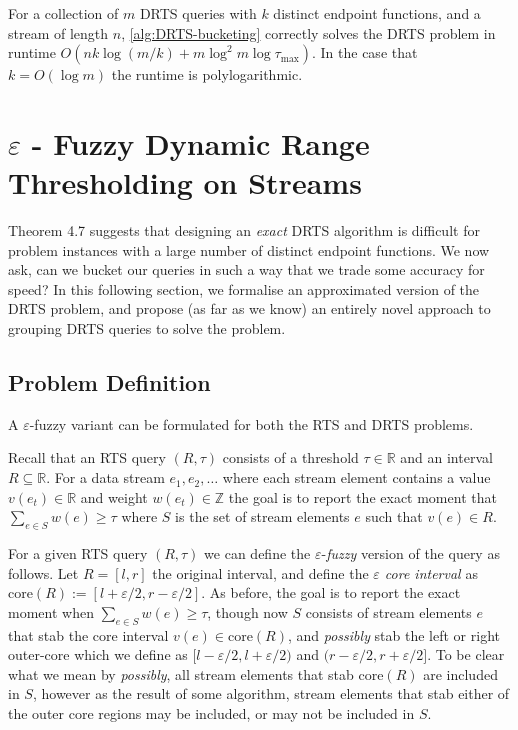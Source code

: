 \begin{theorem}
    For a collection of $m$ DRTS queries with $k$ distinct endpoint functions, and a stream of length $n$, \cref{alg:DRTS-bucketing} correctly solves the DRTS problem in runtime $O(nk\log(m/k) + m\log^2 m\log\tau_{\max})$. In the case that $k = O(\log m)$ the runtime is polylogarithmic.
\end{theorem}



\newpage
\section{$\varepsilon$ - Fuzzy Dynamic Range Thresholding on Streams}

Theorem 4.7 suggests that designing an \textit{exact} DRTS algorithm is difficult for problem instances with a large number of distinct endpoint functions. We now ask, can we bucket our queries in such a way that we trade some accuracy for speed? In this following section, we formalise an approximated version of the DRTS problem, and propose (as far as we know) an entirely novel approach to grouping DRTS queries to solve the problem.

\subsection{Problem Definition}

A $\varepsilon$-fuzzy variant can be formulated for both the RTS and DRTS problems. 

Recall that an RTS query $(R, \tau)$ consists of a threshold $\tau \in\mathbb{R}$ and an interval $R \subseteq\mathbb{R}$. For a data stream $e_1,e_2,\dots$ where each stream element contains a value $v(e_t)\in\mathbb{R}$ and weight $w(e_t)\in\mathbb{Z}$ the goal is to report the exact moment that $\sum_{e\in S} w(e) \geq \tau$ where $S$ is the set of stream elements $e$ such that $v(e)\in R$. 

For a given RTS query $(R, \tau)$ we can define the $\varepsilon$-\textit{fuzzy} version of the query as follows. Let $R = [l, r]$ the original interval, and define the \textit{$\varepsilon$ core interval} as $\text{core}(R) := [l+\varepsilon/2, r-\varepsilon/2]$. As before, the goal is to report the exact moment when $\sum_{e\in S}w(e)\geq\tau$, though now $S$ consists of stream elements $e$ that stab the core interval $v(e) \in \text{core}(R)$, and \textit{possibly} stab the left or right outer-core which we define as $[l-\varepsilon/2, l+\varepsilon/2)$ and $(r-\varepsilon/2, r+\varepsilon/2]$. To be clear what we mean by \textit{possibly}, all stream elements that stab $\text{core}(R)$ are included in $S$, however
as the result of some algorithm, stream elements that stab either of the outer core regions may be included, or may not be included in $S$.

